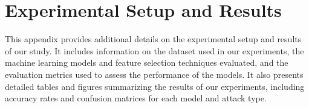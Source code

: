\chapter{Experimental Setup and Results}
This appendix provides additional details on the experimental setup and results of our study. It includes information on the dataset used in our experiments, the machine learning models and feature selection techniques evaluated, and the evaluation metrics used to assess the performance of the models. It also presents detailed tables and figures summarizing the results of our experiments, including accuracy rates and confusion matrices for each model and attack type.
